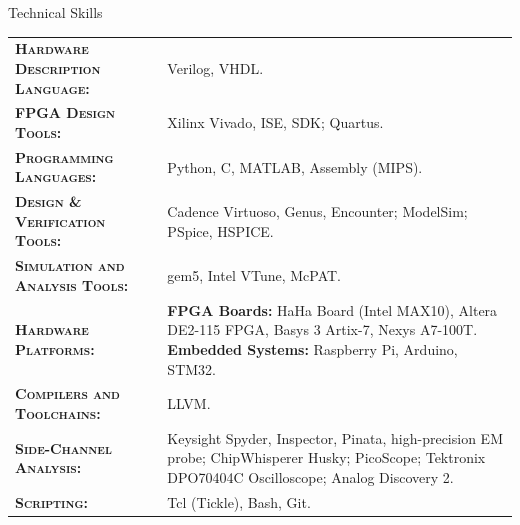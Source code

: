 \begin{rSection}{Technical Skills}

\begin{tabularx}{\textwidth}{@{}p{6cm} X@{}}
    \textsc{\textbf{Hardware Description Language:}} & Verilog, VHDL.\\
    \textsc{\textbf{FPGA Design Tools:}} & Xilinx Vivado, ISE, SDK; Quartus.\\
        \textsc{\textbf{Programming Languages:}} & Python, C, MATLAB, Assembly (MIPS).\\
    \textsc{\textbf{Design \& Verification Tools:}} & Cadence Virtuoso, Genus, Encounter; ModelSim; PSpice, HSPICE.\\
    \textsc{\textbf{Simulation and Analysis Tools:}} & gem5, Intel VTune, McPAT.\\
    \textsc{\textbf{Hardware Platforms:}} & \textbf{FPGA Boards:} HaHa Board (Intel MAX10), Altera DE2-115 FPGA, Basys 3 Artix-7, Nexys A7-100T. \textbf{Embedded Systems:} Raspberry Pi, Arduino, STM32.\\
    \textsc{\textbf{Compilers and Toolchains:}} & LLVM.\\
    \textsc{\textbf{Side-Channel Analysis:}} & Keysight Spyder, Inspector, Pinata, high-precision EM probe; ChipWhisperer Husky; PicoScope; Tektronix DPO70404C Oscilloscope; Analog Discovery 2.\\
    \textsc{\textbf{Scripting:}} & Tcl (Tickle), Bash, Git.\\
\end{tabularx}


\end{rSection}
